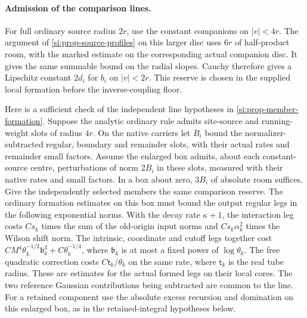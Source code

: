 \documentclass[11pt,letterpaper,reqno]{amsart}
\numberwithin{equation}{section}
\theoremstyle{definition}
\theoremstyle{remark}
\begin{document}
\paragraph{Admission of the comparison lines.}
For full ordinary source radius $2r$, use the constant companions
on $|v|<4r$. The argument of \cref{si:prop-source-profiles} on this
larger disc uses $6r$ of half-product room, with the marked estimate
on the corresponding actual companion disc. It gives the same
summable bound on the radial slopes. Cauchy therefore gives a
Lipschitz constant $2d_i$ for $b_i$ on $|v|<2r$. This reserve is
chosen in the supplied local formation before the inverse-coupling
floor.

Here is a sufficient check of the independent line hypotheses in
\cref{si:prop-member-formation}. Suppose the analytic ordinary rule admits
site-source and running-weight slots of radius $4r$. On the native
carriers let $B_i$ bound the normalizer-subtracted regular,
boundary and remainder slots, with their actual rates and
remainder small factors. Assume the enlarged box admits, about each constant-source
centre, perturbations of norm $2B_i$ in these slots, measured
with their native rates and small factors. In a box about zero,
$3B_i$ of absolute room suffices. Give the independently
selected members the same comparison reserve. The
ordinary formation estimates on this box must bound the output
regular legs in the following exponential norms. With the decay rate
$\kappa+1$, the interaction leg costs $Cs_k$ times the sum of the
old-origin input norms and $Cs_k\alpha_k^2$ times the Wilson shift
norm. The intrinsic, coordinate and cutoff legs together cost
$C M^4\theta_k^{-1/2}\mathfrak b_k^3+C\theta_k^{-1/4}$, where
$\mathfrak b_k$ is at most a fixed power of $\log\theta_k$. The free
quadratic correction costs $C\mathsf t_k/\theta_k$ on the same rate,
where $\mathsf t_k$ is the real tube radius. These are estimates
for the actual formed legs on their local cores. The two
reference Gaussian contributions being subtracted are common
to the line. For a retained component use the absolute excess
recursion and domination on this enlarged box, as in the
retained-integral hypotheses below.
\end{document}
